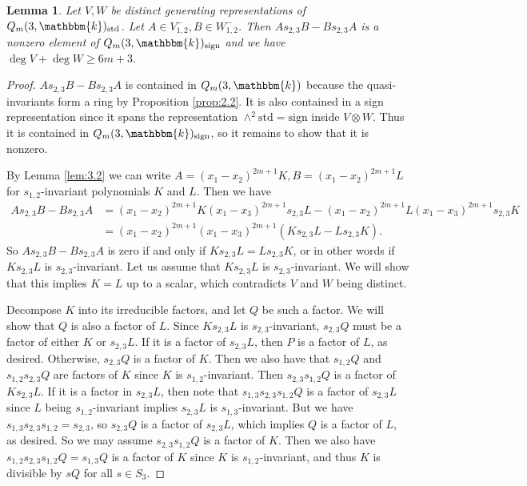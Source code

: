 \documentclass[11pt]{article}
\newtheorem{lemma}[theorem]{Lemma}
\theoremstyle{definition}
\renewcommand{\k}{\mathbbm{k}}
\newcommand{\std}{\mathrm{std}}
\newcommand{\sgn}{\mathrm{sign}}
\begin{document}
\begin{lemma}\label{lem:3.4}
    Let $V,W$ be distinct generating representations of $Q_m(3,\k)_\std$. Let $A\in V_{1,2}^-,B\in W_{1,2}^-$. Then $As_{2,3}B-Bs_{2,3}A$ is a nonzero element of $Q_m(3,\k)_\sgn$ and we have $\deg V+\deg W\geq 6m+3$.
\end{lemma}
\begin{proof}
    $As_{2,3}B-Bs_{2,3}A$ is contained in $Q_m(3,\k)$ because the quasi-invariants form a ring by Proposition \ref{prop:2.2}. It is also contained in a sign representation since it spans the representation $\wedge^2\std=\sgn$ inside $V\otimes W$. Thus it is contained in $Q_m(3,\k)_\sgn$, so it remains to show that it is nonzero.
    
    By Lemma \ref{lem:3.2} we can write $A=(x_1-x_2)^{2m+1}K,B=(x_1-x_2)^{2m+1}L$ for $s_{1,2}$-invariant polynomials $K$ and $L$. Then we have
    \begin{align*}
        As_{2,3}B-Bs_{2,3}A&=(x_1-x_2)^{2m+1}K(x_1-x_3)^{2m+1}s_{2,3}L-(x_1-x_2)^{2m+1}L(x_1-x_3)^{2m+1}s_{2,3}K\\
        &=(x_1-x_2)^{2m+1}(x_1-x_3)^{2m+1}(Ks_{2,3}L-Ls_{2,3}K).
    \end{align*}
    So $As_{2,3}B-Bs_{2,3}A$ is zero if and only if $Ks_{2,3}L=Ls_{2,3}K$, or in other words if $Ks_{2,3}L$ is $s_{2,3}$-invariant. Let us assume that $Ks_{2,3}L$ is $s_{2,3}$-invariant. We will show that this implies $K=L$ up to a scalar, which contradicts $V$ and $W$ being distinct.
    
    Decompose $K$ into its irreducible factors, and let $Q$ be such a factor. We will show that $Q$ is also a factor of $L$. Since $Ks_{2,3}L$ is $s_{2,3}$-invariant, $s_{2,3}Q$ must be a factor of either $K$ or $s_{2,3}L$. If it is a factor of $s_{2,3}L$, then $P$ is a factor of $L$, as desired. Otherwise, $s_{2,3}Q$ is a factor of $K$. Then we also have that $s_{1,2}Q$ and $s_{1,2}s_{2,3}Q$ are factors of $K$ since $K$ is $s_{1,2}$-invariant. Then $s_{2,3}s_{1,2}Q$ is a factor of $Ks_{2,3}L$. If it is a factor in $s_{2,3}L$, then note that $s_{1,3}s_{2,3}s_{1,2}Q$ is a factor of $s_{2,3}L$ since $L$ being $s_{1,2}$-invariant implies $s_{2,3}L$ is $s_{1,3}$-invariant. But we have $s_{1,3}s_{2,3}s_{1,2}=s_{2,3}$, so $s_{2,3}Q$ is a factor of $s_{2,3}L$, which implies $Q$ is a factor of $L$, as desired. So we may assume $s_{2,3}s_{1,2}Q$ is a factor of $K$. Then we also have $s_{1,2}s_{2,3}s_{1,2}Q=s_{1,3}Q$ is a factor of $K$ since $K$ is $s_{1,2}$-invariant, and thus $K$ is divisible by $sQ$ for all $s\in S_3$. 
    

\end{proof}
\end{document}
